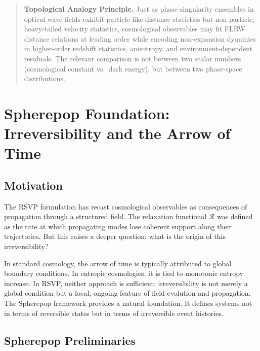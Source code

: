 \documentclass[12pt,a4paper]{article}
\theoremstyle{remark}
\newcommand{\Rcal}{\mathcal{R}}
\begin{document}
\begin{quote}
\textbf{Topological Analogy Principle.}
Just as phase-singularity ensembles in optical wave fields exhibit
particle-like distance statistics but non-particle, heavy-tailed velocity
statistics, cosmological observables may fit FLRW distance relations at leading
order while encoding non-expansion dynamics in higher-order redshift statistics,
anisotropy, and environment-dependent residuals. The relevant comparison is not
between two scalar numbers (cosmological constant vs.\ dark energy), but between
two phase-space distributions.
\end{quote}



\section{Spherepop Foundation: Irreversibility and the Arrow of Time}
\label{sec:spherepop}

\subsection{Motivation}

The RSVP formulation has recast cosmological observables as consequences of propagation through a structured field. The relaxation functional $\Rcal$ was defined as the rate at which propagating modes lose coherent support along their trajectories. But this raises a deeper question: what is the origin of this irreversibility?

In standard cosmology, the arrow of time is typically attributed to global boundary conditions. In entropic cosmologies, it is tied to monotonic entropy increase. In RSVP, neither approach is sufficient: irreversibility is not merely a global condition but a local, ongoing feature of field evolution and propagation. The Spherepop framework provides a natural foundation. It defines systems not in terms of reversible states but in terms of irreversible event histories.

\subsection{Spherepop Preliminaries}
\end{document}
